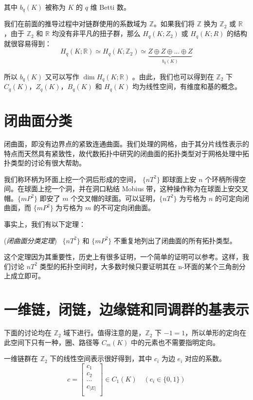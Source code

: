 其中 $ b_q(K) $ 被称为 $ K $ 的 $ q $ 维 Betti 数。

我们在前面的推导过程中对链群使用的系数域为 $ \mathbb Z $。如果我们将 $ \mathbb{Z} $ 换为 $ \mathbb{Z}_2 $ 或 $ \mathbb{R} $，由于 $ \mathbb{Z}_2 $ 和 $ \mathbb{R} $ 均没有非平凡的扭子群，那么 $ H_q(K; Z_2) $ 或 $ H_q(K; R) $ 的结构就很容易得到：
$$
H_q(K;\mathbb{R}) \simeq H_q(K;\mathbb{Z}_2) \simeq\underbrace{Z \oplus Z \oplus \dots \oplus Z}_{b_q(K)}
$$

所以 $ b_q(K) $ 又可以写作 $ \dim H_q(K; \mathbb{R}) $ 。由此，我们也可以得到在 $ \mathbb{Z}_2 $ 下 $ C_q(K) $，$ Z_q(K) $，$ B_q(K) $ 和 $ H_q(K) $ 均为线性空间，有维度和基的概念。

\section{闭曲面分类}

闭曲面，即没有边界点的紧致连通曲面。我们处理的网格，由于其分片线性表示的特点而天然具有紧致性，故代数拓扑中研究的闭曲面的拓扑类型对于网格处理中拓扑类型的讨论有很大帮助。

我们称环柄为环面上挖一个洞后形成的空间， $ \{nT^2\} $ 即球面上安 $ n $ 个环柄所得空间。在球面上挖一个洞，并在洞口粘结 Mobius 带，这种操作称为在球面上安交叉帽。$ \{mP^2\} $ 即安了 $ m $ 个交叉帽的球面。可以证明，$ \{nT^2\} $ 为亏格为 $ n $ 的可定向闭曲面，而 $ \{mP^2\} $ 为亏格为 $ m $ 的不可定向闭曲面。

事实上，我们有以下定理：

\begin{theorem}
    (\emph{闭曲面分类定理})~
    $ \{nT^2 \} $ 和 $ \{mP^2\} $ 不重复地列出了闭曲面的所有拓扑类型。
\end{theorem}

这个定理因为其重要性，历史上有很多证明，一个简单的证明可以参考\cite{jctpxjy}。这样，我们讨论 $ nT^2 $ 类型的拓扑空间时，大多数时候只要证明其在 n-环面的某个三角剖分上成立即可。

\section{一维链，闭链，边缘链和同调群的基表示}

下面的讨论均在 $ \mathbb{Z}_2 $ 域下进行。值得注意的是，$ \mathbb{Z}_2 $ 下 $ -1 = 1 $，所以单形的定向在此空间下只有一种，圈、路径等 $ C_m(K) $ 中的元素也不需要指明定向。

一维链群在 $ \mathbb{Z}_2 $ 下的线性空间表示很好得到，其中 $ c_i $ 为边 $ e_i $ 对应的系数。
$$
c = \begin{bmatrix}
        c_1 \\
        c_2 \\
        \cdots \\
        c_{|E|} \\
    \end{bmatrix} \in C_1(K) \quad (c_i \in \{0, 1\})
$$

